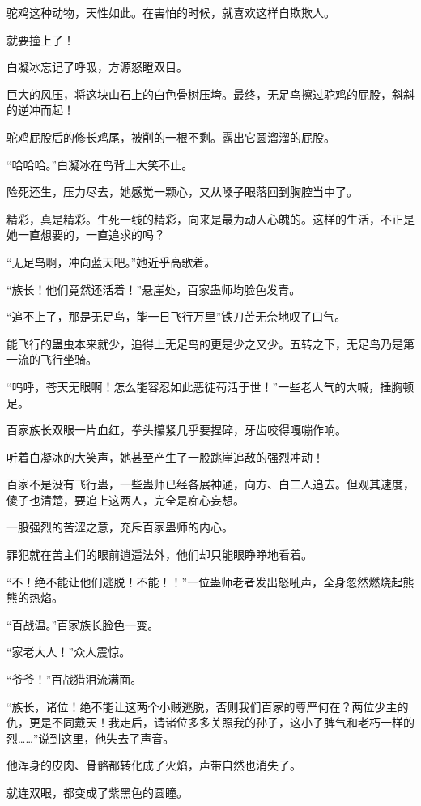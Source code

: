\begin{this_body}
驼鸡这种动物，天性如此。在害怕的时候，就喜欢这样自欺欺人。

就要撞上了！

白凝冰忘记了呼吸，方源怒瞪双目。

巨大的风压，将这块山石上的白色骨树压垮。最终，无足鸟擦过驼鸡的屁股，斜斜的逆冲而起！

驼鸡屁股后的修长鸡尾，被削的一根不剩。露出它圆溜溜的屁股。

“哈哈哈。”白凝冰在鸟背上大笑不止。

险死还生，压力尽去，她感觉一颗心，又从嗓子眼落回到胸腔当中了。

精彩，真是精彩。生死一线的精彩，向来是最为动人心魄的。这样的生活，不正是她一直想要的，一直追求的吗？

“无足鸟啊，冲向蓝天吧。”她近乎高歌着。

“族长！他们竟然还活着！”悬崖处，百家蛊师均脸色发青。

“追不上了，那是无足鸟，能一日飞行万里”铁刀苦无奈地叹了口气。

能飞行的蛊虫本来就少，追得上无足鸟的更是少之又少。五转之下，无足鸟乃是第一流的飞行坐骑。

“呜呼，苍天无眼啊！怎么能容忍如此恶徒苟活于世！”一些老人气的大喊，捶胸顿足。

百家族长双眼一片血红，拳头攥紧几乎要捏碎，牙齿咬得嘎嘣作响。

听着白凝冰的大笑声，她甚至产生了一股跳崖追敌的强烈冲动！

百家不是没有飞行蛊，一些蛊师已经各展神通，向方、白二人追去。但观其速度，傻子也清楚，要追上这两人，完全是痴心妄想。

一股强烈的苦涩之意，充斥百家蛊师的内心。

罪犯就在苦主们的眼前逍遥法外，他们却只能眼睁睁地看着。

“不！绝不能让他们逃脱！不能！！”一位蛊师老者发出怒吼声，全身忽然燃烧起熊熊的热焰。

“百战温。”百家族长脸色一变。

“家老大人！”众人震惊。

“爷爷！”百战猎泪流满面。

“族长，诸位！绝不能让这两个小贼逃脱，否则我们百家的尊严何在？两位少主的仇，更是不同戴天！我走后，请诸位多多关照我的孙子，这小子脾气和老朽一样的烈……”说到这里，他失去了声音。

他浑身的皮肉、骨骼都转化成了火焰，声带自然也消失了。

就连双眼，都变成了紫黑色的圆瞳。


\end{this_body}
